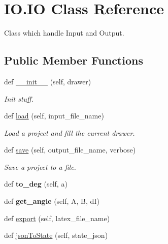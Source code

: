 \hypertarget{classIO_1_1IO}{}\section{I\+O.\+IO Class Reference}
\label{classIO_1_1IO}


Class which handle Input and Output.  


\subsection*{Public Member Functions}
\begin{DoxyCompactItemize}
\item 
\mbox{\label{classIO_1_1IO_a0de24891646dad0069808df1693d4a0a}} 
def \mbox{\hyperlink{classIO_1_1IO_a0de24891646dad0069808df1693d4a0a}{\+\_\+\+\_\+init\+\_\+\+\_\+}} (self, drawer)
\begin{DoxyCompactList}\small\item\em Init stuff. \end{DoxyCompactList}\item 
def \mbox{\hyperlink{classIO_1_1IO_ae3b4bcb49eeb2b09deeb5e79c53e504f}{load}} (self, input\+\_\+file\+\_\+name)
\begin{DoxyCompactList}\small\item\em Load a project and fill the current drawer. \end{DoxyCompactList}\item 
def \mbox{\hyperlink{classIO_1_1IO_ab4e2498c5e6baefd2d51950edf0bc33a}{save}} (self, output\+\_\+file\+\_\+name, verbose)
\begin{DoxyCompactList}\small\item\em Save a project to a file. \end{DoxyCompactList}\item 
\mbox{\label{classIO_1_1IO_a52707967c2e703500f0a5027654151e8}} 
def {\bfseries to\+\_\+deg} (self, a)
\item 
\mbox{\label{classIO_1_1IO_ab0a430a9ea6b889d1645c327b55a17c4}} 
def {\bfseries get\+\_\+angle} (self, A, B, dI)
\item 
def \mbox{\hyperlink{classIO_1_1IO_a853df2a0f17524cce2b325ad5d865158}{export}} (self, latex\+\_\+file\+\_\+name)
\item 
def \mbox{\hyperlink{classIO_1_1IO_a556de6d0c4bbf2c5d2891607fe569efc}{json\+To\+State}} (self, state\+\_\+json)

\end{DoxyCompactItemize}
